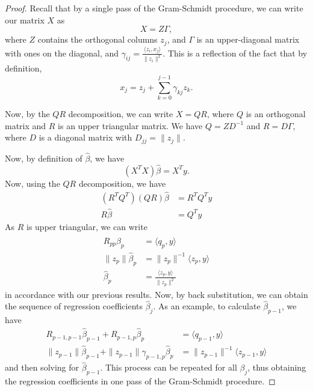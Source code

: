 \documentclass[12pt]{amsart}
\theoremstyle{plain}%
\theoremstyle{definition}
\theoremstyle{remark}
\begin{document}
\begin{proof}
    Recall that by a single pass of the Gram-Schmidt procedure, we can write our matrix $X$ as \[
        X = Z \Gamma,
        \] where $Z$ contains the orthogonal columns $z_j$, and $\Gamma$ is an upper-diagonal matrix with ones on the diagonal, and $\gamma_{ij} = \frac{\langle z_i, x_j \rangle}{\| z_i \|^2}$. This is a reflection of the fact that by definition, \[
            x_j = z_j + \sum_{k=0}^{j-1} \gamma_{kj} z_k.
            \]

            Now, by the $QR$ decomposition, we can write $X = QR$, where $Q$ is an orthogonal matrix and $R$ is an upper triangular matrix.  We have $Q = Z D^{-1}$ and $R = D\Gamma$, where $D$ is a diagonal matrix  with $D_{jj} = \| z_j \|$.  

    Now, by definition of $\hat \beta$, we have \[
        (X^T X) \hat \beta = X^T y.
        \]  Now, using the $QR$ decomposition, we have \begin{align*}
            (R^T Q^T) (QR) \hat \beta &= R^T Q^T y \\
            R \hat \beta &= Q^T y
        \end{align*}
    As $R$ is upper triangular, we can write \begin{align*}
        R_{pp} \hat \beta_p &= \langle q_p, y \rangle \\
        \| z_p \| \hat \beta_p &= \| z_p \|^{-1} \langle z_p, y \rangle \\
        \hat \beta_p &= \frac{\langle z_p, y \rangle}{\| z_p \|^2}
    \end{align*} in accordance with our previous results.  Now, by back substitution, we can obtain the sequence of regression coefficients $\hat \beta_j$.  As an example, to calculate $\hat \beta_{p-1}$, we have \begin{align*}
        R_{p-1, p-1} \hat \beta_{p-1} + R_{p-1,p} \hat \beta_p &= \langle q_{p-1}, y \rangle \\
        \| z_{p-1} \| \hat \beta_{p-1} + \| z_{p-1} \| \gamma_{p-1,p} \hat \beta_p &= \| z_{p-1} \|^{-1} \langle z_{p-1}, y \rangle 
    \end{align*} and then solving for $\hat \beta_{p-1}$. This process can be repeated for all $\beta_j$, thus obtaining the regression coefficients in one pass of the Gram-Schmidt procedure.
\end{proof}
\end{document}
